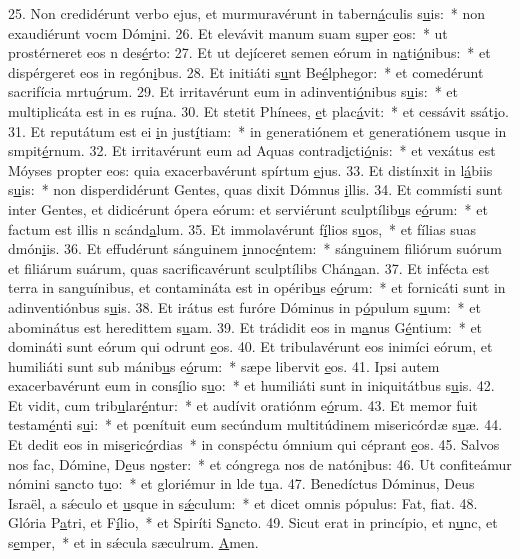 25. Non credidérunt verbo ejus, et murmuravérunt in tabern\uline{á}culis s\uline{u}is:~* non exaudiérunt vocm Dóm\uline{i}ni.
26. Et elevávit manum suam s\uline{u}per \uline{e}os:~* ut prostérneret eos n des\uline{é}rto:
27. Et ut dejíceret semen eórum in n\uline{a}ti\uline{ó}nibus:~* et dispérgeret eos in regón\uline{i}bus.
28. Et initiáti s\uline{u}nt Be\uline{é}lphegor:~* et comedérunt sacrifícia mrtu\uline{ó}rum.
29. Et irritavérunt eum in adinventi\uline{ó}nibus s\uline{u}is:~* et multiplicáta est in es ru\uline{í}na.
30. Et stetit Phínees, \uline{e}t plac\uline{á}vit:~* et cessávit ssát\uline{i}o.
31. Et reputátum est ei \uline{i}n just\uline{í}tiam:~* in generatiónem et generatiónem usque in smpit\uline{é}rnum.
32. Et irritavérunt eum ad Aquas contrad\uline{i}cti\uline{ó}nis:~* et vexátus est Móyses propter eos: quia exacerbavérunt spírtum \uline{e}jus.
33. Et distínxit in l\uline{á}biis s\uline{u}is:~* non disperdidérunt Gentes, quas dixit Dómnus \uline{i}llis.
34. Et commísti sunt inter Gentes, et didicérunt ópera eórum: et serviérunt sculptílib\uline{u}s e\uline{ó}rum:~* et factum est illis n scánd\uline{a}lum.
35. Et immolavérunt f\uline{í}lios s\uline{u}os,~* et fílias suas dmón\uline{i}is.
36. Et effudérunt sánguinem \uline{i}nnoc\uline{é}ntem:~* sánguinem filiórum suórum et filiárum suárum, quas sacrificavérunt sculptílibs Chán\uline{a}an.
37. Et infécta est terra in sanguínibus, et contamináta est in opérib\uline{u}s e\uline{ó}rum:~* et fornicáti sunt in adinventiónbus s\uline{u}is.
38. Et irátus est furóre Dóminus in p\uline{ó}pulum s\uline{u}um:~* et abominátus est heredittem s\uline{u}am.
39. Et trádidit eos in m\uline{a}nus G\uline{é}ntium:~* et domináti sunt eórum qui odrunt \uline{e}os.
40. Et tribulavérunt eos inimíci eórum, et humiliáti sunt sub mánib\uline{u}s e\uline{ó}rum:~* sæpe libervit \uline{e}os.
41. Ipsi autem exacerbavérunt eum in cons\uline{í}lio s\uline{u}o:~* et humiliáti sunt in iniquitátbus s\uline{u}is.
42. Et vidit, cum trib\uline{u}lar\uline{é}ntur:~* et audívit oratiónm e\uline{ó}rum.
43. Et memor fuit testam\uline{é}nti s\uline{u}i:~* et pœnítuit eum secúndum multitúdinem misericórdæ s\uline{u}æ.
44. Et dedit eos in mis\uline{e}ric\uline{ó}rdias~* in conspéctu ómnium qui céprant \uline{e}os.
45. Salvos nos fac, Dómine, D\uline{e}us n\uline{o}ster:~* et cóngrega nos de natón\uline{i}bus:
46. Ut confiteámur nómini s\uline{a}ncto t\uline{u}o:~* et gloriémur in lde t\uline{u}a.
47. Benedíctus Dóminus, Deus Israël, a sǽculo et \uline{u}sque in s\uline{ǽ}culum:~* et dicet omnis pópulus: Fat, f\uline{i}at.
48. Glória P\uline{a}tri, et F\uline{í}lio,~* et Spiríti S\uline{a}ncto.
49. Sicut erat in princípio, et n\uline{u}nc, et s\uline{e}mper,~* et in sǽcula sæculrum. \uline{A}men.
